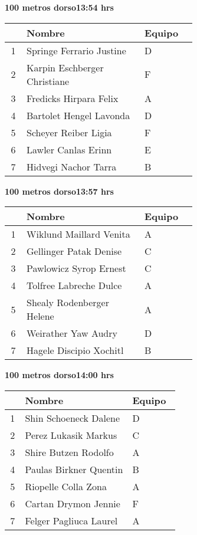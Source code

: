 \begin{minipage}{0.95\linewidth}
\begin{center}
\textbf{
100 metros dorso\hspace{1cm}13:54 hrs}
\end{center}
\begin{tabular}{cp{0.63\linewidth}l}
\hline
& \textbf{Nombre} & \textbf{Equipo} \\ \hline
1 & Springe Ferrario Justine & D \\ 
2 & Karpin Eschberger Christiane & F \\ 
3 & Fredicks Hirpara Felix & A \\ 
4 & Bartolet Hengel Lavonda & D \\ 
5 & Scheyer Reiber Ligia & F \\ 
6 & Lawler Canlas Erinn & E \\ 
7 & Hidvegi Nachor Tarra & B \\ 
\end{tabular}
\end{minipage}
\begin{minipage}{0.95\linewidth}
\begin{center}
\textbf{
100 metros dorso\hspace{1cm}13:57 hrs}
\end{center}
\begin{tabular}{cp{0.63\linewidth}l}
\hline
& \textbf{Nombre} & \textbf{Equipo} \\ \hline
1 & Wiklund Maillard Venita & A \\ 
2 & Gellinger Patak Denise & C \\ 
3 & Pawlowicz Syrop Ernest & C \\ 
4 & Tolfree Labreche Dulce & A \\ 
5 & Shealy Rodenberger Helene & A \\ 
6 & Weirather Yaw Audry & D \\ 
7 & Hagele Discipio Xochitl & B \\ 
\end{tabular}
\end{minipage}
\begin{minipage}{0.95\linewidth}
\begin{center}
\textbf{
100 metros dorso\hspace{1cm}14:00 hrs}
\end{center}
\begin{tabular}{cp{0.63\linewidth}l}
\hline
& \textbf{Nombre} & \textbf{Equipo} \\ \hline
1 & Shin Schoeneck Dalene & D \\ 
2 & Perez Lukasik Markus & C \\ 
3 & Shire Butzen Rodolfo & A \\ 
4 & Paulas Birkner Quentin & B \\ 
5 & Riopelle Colla Zona & A \\ 
6 & Cartan Drymon Jennie & F \\ 
7 & Felger Pagliuca Laurel & A \\ 
\end{tabular}
\end{minipage}
